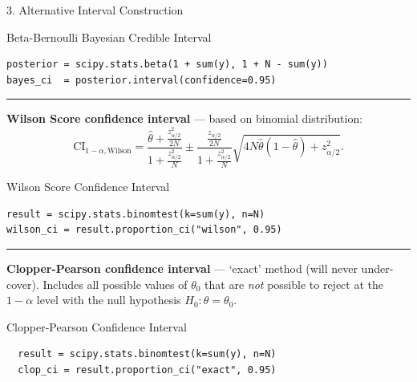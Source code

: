 \documentclass[final]{beamer}
\newlength{\colwidth}
\begin{document}
\begin{frame}[fragile]
\begin{columns}[t]
\begin{column}{\colwidth}
\begin{block}{3. Alternative Interval Construction}
    \begin{pbox}[label={ex:bayes_simple}]{Beta-Bernoulli Bayesian Credible Interval}
    \begin{verbatim}
posterior = scipy.stats.beta(1 + sum(y), 1 + N - sum(y))
bayes_ci  = posterior.interval(confidence=0.95)
    \end{verbatim}
    \end{pbox}

    \vspace{-1.25em}
    \begin{center}
      \rule{0.8\textwidth}{0.4pt}
    \end{center}

    \textbf{Wilson Score confidence interval} --- based on binomial distribution:
    $$
    \text{CI}_{1-\alpha, \text{Wilson}} = \frac{\hat{\theta} + \frac{z_{\alpha/2}^2}{2N}}{1 + \frac{z_{\alpha/2}^2}{N}} \pm \frac{\frac{z_{\alpha/2}}{2N}}{1 + \frac{z_{\alpha/2}^2}{N}}\sqrt{4N\hat{\theta}(1 - \hat{\theta}) + z_{\alpha/2}^2}.
    $$

    \begin{pbox}[label={ex:wilson_simple}]{Wilson Score Confidence Interval}
    \begin{verbatim}
result = scipy.stats.binomtest(k=sum(y), n=N)
wilson_ci = result.proportion_ci("wilson", 0.95)
    \end{verbatim}
    \end{pbox}

    \vspace{-1.25em}
    \begin{center}
      \rule{0.8\textwidth}{0.4pt}
    \end{center}

    \textbf{Clopper-Pearson confidence interval} --- `exact' method (will never under-cover). 
    Includes all possible values of $\theta_0$ that are \textit{not} possible to reject at the $1-\alpha$ level with the null hypothesis $H_0: \theta = \theta_0$.

    \begin{pbox}[label={ex:clopper_simple}]{Clopper-Pearson Confidence Interval}
      \begin{verbatim}
  result = scipy.stats.binomtest(k=sum(y), n=N)
  clop_ci = result.proportion_ci("exact", 0.95)
      \end{verbatim}
      \end{pbox}


\end{block}
\end{column}
\end{columns}
\end{frame}
\end{document}
